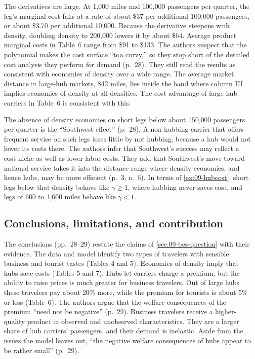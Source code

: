 The derivatives are large. At 1,000 miles and 100,000 passengers per quarter, the leg's marginal cost
falls at a rate of about \$37 per additional 100,000 passengers, or about \$3.70 per additional 10,000.
Because the derivative steepens with density, doubling density to 200,000 lowers it by about \$64. Average
product marginal costs in Table~6 range from \$91 to
\$133. The authors suspect that the polynomial makes the cost surface ``too curvy,'' so they stop short of
the detailed cost analysis they perform for demand (p.~28). They still read the results as consistent with
economies of density over a wide range. The average market distance in large-hub markets, 842 miles, lies
inside the band where column III implies economies of density at all densities. The cost advantage of large
hub carriers in Table~6 is consistent with this.

The absence of density economies on short legs below about 150,000 passengers per quarter is the
``Southwest effect'' (p.~28). A non-hubbing carrier that offers frequent service on such legs loses little
by not hubbing, because a hub would not lower its costs there. The authors infer that Southwest's success may reflect a cost niche as well as lower
labor costs. They add that Southwest's move toward national service takes it into the distance range where
density economies, and hence hubs, may be more efficient (p.~3, n.~6). In terms of \cref{ex:09-hubcost},
short legs below that density behave like $\gamma\ge1$, where hubbing never saves cost, and legs of 600 to 1,600 miles behave
like $\gamma<1$.

\subsection{Conclusions, limitations, and contribution}\label{sec:09-bcs-conclusions}

The conclusions (pp.~28--29) restate the claims of \cref{sec:09-bcs-question} with their evidence. The data
and model identify two types of travelers with sensible business and tourist tastes (Tables 4 and 5).
Economies of density imply that hubs save costs (Tables 5 and 7). Hubs let carriers charge a premium, but the
ability to raise prices is much greater for business travelers. Out of large hubs these travelers pay about
20\% more, while the premium for tourists is about 5\% or less (Table~6). The authors argue that the welfare
consequences of the premium ``need not be negative'' (p.~29). Business travelers receive a higher-quality product in observed and
unobserved characteristics. They are a larger share of hub carriers' passengers, and their demand is
inelastic. Aside from the issues the model leaves out, ``the negative welfare consequences of hubs appear to
be rather small'' (p.~29).

